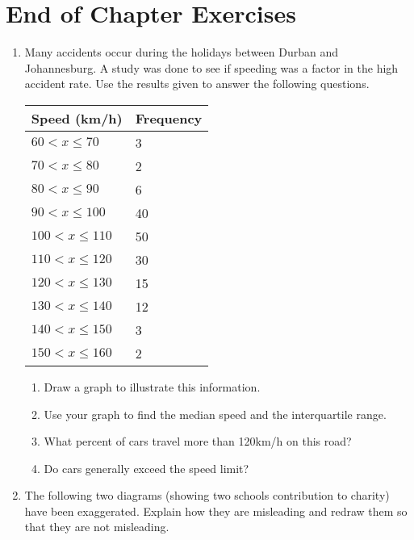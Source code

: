 \section{End of Chapter Exercises}
\begin{enumerate}
\item Many accidents occur during the holidays between Durban and Johannesburg. A study was done to see if speeding was a factor in the high accident rate. Use the results given to answer the following questions.

\begin{center}
\begin{tabular}{|l|l|}
\hline
Speed (km/h) & Frequency \\ 
\hline
 $60<x\leq 70$   & 3  \\
 $70<x\leq 80$   & 2  \\
 $80<x\leq 90$   & 6  \\
 $90<x\leq 100$  & 40 \\
 $100<x\leq 110$ & 50 \\
 $110<x\leq 120$ & 30 \\
 $120<x\leq 130$ & 15 \\
 $130<x\leq 140$ & 12 \\
 $140<x\leq 150$ & 3  \\
 $150<x\leq 160$ & 2  \\
\hline
\end{tabular}
\end{center}

	\begin{enumerate}
	\item Draw a graph to illustrate this information. 
	\item Use your graph to find the median speed and the interquartile range.
	\item What percent of cars travel more than 120km/h on this road?
	\item Do cars generally exceed the speed limit?
	\end{enumerate}

\item The following two diagrams (showing two schools contribution to charity) have been exaggerated. Explain how they are misleading and redraw them so that they are not misleading.


\end{enumerate}
